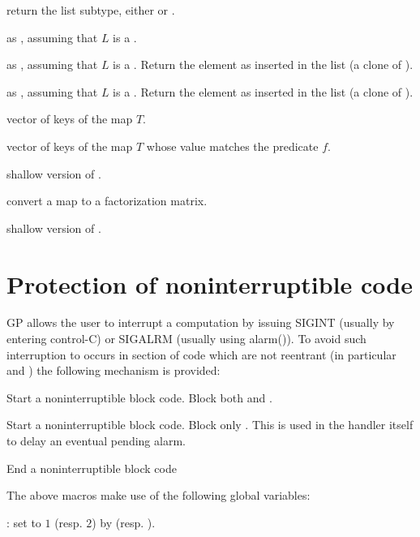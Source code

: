  return the list subtype, either  or
.

 as ,
assuming that $L$ is a .

 as ,
assuming that $L$ is a . Return the element as inserted
in the list (a clone of ).

 as ,
assuming that $L$ is a . Return the element as inserted
in the list (a clone of ).

 vector of keys of the map $T$.

vector of keys of the map $T$ whose value matches the predicate $f$.

 shallow version of .

 convert a map to a factorization matrix.

 shallow version of .

\section{Protection of noninterruptible code}

GP allows the user to interrupt a computation by issuing SIGINT
(usually by entering control-C) or SIGALRM (usually using alarm()).
To avoid such interruption to occurs in section of code which are not
reentrant (in particular  and )
the following mechanism is provided:

  Start a noninterruptible block code. Block both  and .

  Start a noninterruptible block code. Block only .
This is used in the  handler itself to delay an eventual pending
alarm.

  End a noninterruptible block code

The above macros make use of the following global variables:

: set to $1$ (resp. $2$) by 
(resp. ).

